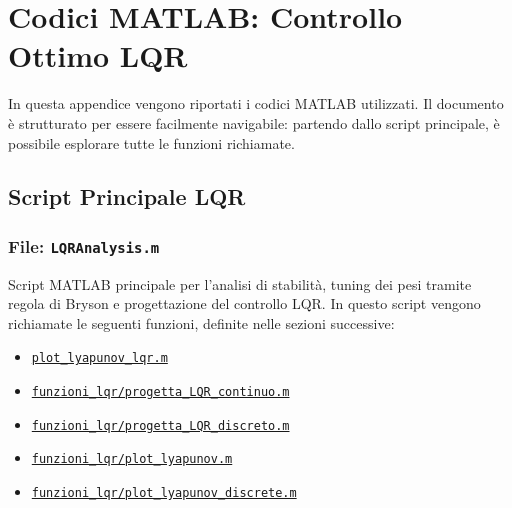 \chapter{Codici MATLAB: Controllo Ottimo LQR}

In questa appendice vengono riportati i codici MATLAB utilizzati. Il documento è strutturato per essere facilmente navigabile: partendo dallo script principale, è possibile esplorare tutte le funzioni richiamate.

\section*{Script Principale LQR}
\subsection*{File: \texttt{LQRAnalysis.m}}
\label{sec:LQRAnalysis}

Script MATLAB principale per l'analisi di stabilità, tuning dei pesi tramite regola di Bryson e progettazione del controllo LQR. In questo script vengono richiamate le seguenti funzioni, definite nelle sezioni successive:
\begin{itemize}
    \item \hyperref[sec:plot_lyapunov_lqr]{\texttt{plot\_lyapunov\_lqr.m}}
    \item \hyperref[sec:funzioni_lqr_progetta_LQR_continuo]{\texttt{funzioni\_lqr/progetta\_LQR\_continuo.m}}
    \item \hyperref[sec:funzioni_lqr_progetta_LQR_discreto]{\texttt{funzioni\_lqr/progetta\_LQR\_discreto.m}}
    \item \hyperref[sec:funzioni_lqr_plot_lyapunov]{\texttt{funzioni\_lqr/plot\_lyapunov.m}}
    \item \hyperref[sec:funzioni_lqr_plot_lyapunov_discrete]{\texttt{funzioni\_lqr/plot\_lyapunov\_discrete.m}}
\end{itemize}

